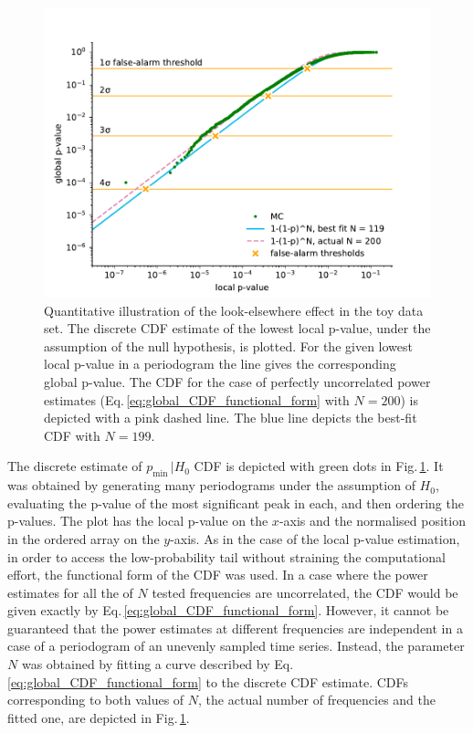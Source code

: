 \begin{figure}
  \centering
  \includegraphics[width=\linewidth]{gfx/axions/MC_estimation_global.pdf}
  \caption{Quantitative illustration of the look-elsewhere effect in the toy data set. The discrete CDF estimate of the lowest local p-value, under the assumption of the null hypothesis, is plotted. For the given lowest local p-value in a periodogram the line gives the corresponding global p-value. The CDF for the case of perfectly uncorrelated power estimates (Eq.\,\ref{eq:global_CDF_functional_form} with $N=200$) is depicted with a pink dashed line. The blue line depicts the best-fit CDF with $N=199$.
  }\label{fig:P_look-elsewhere}
\end{figure}

The discrete estimate of $p_\text{min} \, | H_0$ CDF is depicted with green dots in Fig.\,\ref{fig:P_look-elsewhere}. It was obtained by generating many periodograms under the assumption of $H_0$, evaluating the p-value of the most significant peak in each, and then ordering the p-values. The plot has the local p-value on the $x$-axis and the normalised position in the ordered array on the $y$-axis.
As in the case of the local p-value estimation, in order to access the low-probability tail without straining the computational effort, the functional form of the CDF was used.
In a case where the power estimates for all the of $N$ tested frequencies are uncorrelated, the CDF would be given exactly by Eq.\,\ref{eq:global_CDF_functional_form}.
However, it cannot be guaranteed that the power estimates at different frequencies are independent in a case of a periodogram of an unevenly sampled time series.
Instead, the parameter $N$ was obtained by fitting a curve described by Eq.\,\ref{eq:global_CDF_functional_form} to the discrete CDF estimate. CDFs corresponding to both values of $N$, the actual number of frequencies and the fitted one, are depicted in Fig.\,\ref{fig:P_look-elsewhere}.

